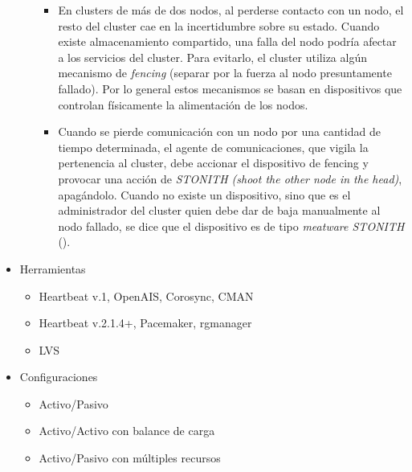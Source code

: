 \begin{itemize}
\begin{itemize}
\begin{itemize}
			\item En clusters de más de dos nodos, al perderse contacto con un nodo, el resto del cluster cae en la incertidumbre sobre su estado. Cuando existe almacenamiento compartido, una falla del nodo podría afectar a los servicios del cluster. Para evitarlo, el cluster utiliza algún mecanismo de \textit{fencing} (separar por la fuerza al nodo presuntamente fallado). Por lo general estos mecanismos se basan en dispositivos que controlan físicamente la alimentación de los nodos. 
			\item Cuando se pierde comunicación con un nodo por una cantidad de tiempo determinada, el agente de comunicaciones, que vigila la pertenencia al cluster, debe accionar el dispositivo de fencing y provocar una acción de \textit{STONITH (shoot the other node in the head)}, apagándolo. Cuando no existe un dispositivo, sino que es el administrador del cluster quien debe dar de baja manualmente al nodo fallado, se dice que el dispositivo es de tipo \textit{meatware STONITH} (\smiley{}).
		\end{itemize}
	\end{itemize}
	\item Herramientas
	\begin{itemize}
		\item Heartbeat v.1, OpenAIS, Corosync, CMAN
		\item Heartbeat v.2.1.4+, Pacemaker, rgmanager
		\item LVS
	\end{itemize}
	\item Configuraciones
	\begin{itemize}
		\item Activo/Pasivo
		\item Activo/Activo con balance de carga
		\item Activo/Pasivo con múltiples recursos
	\end{itemize}
\end{itemize}


